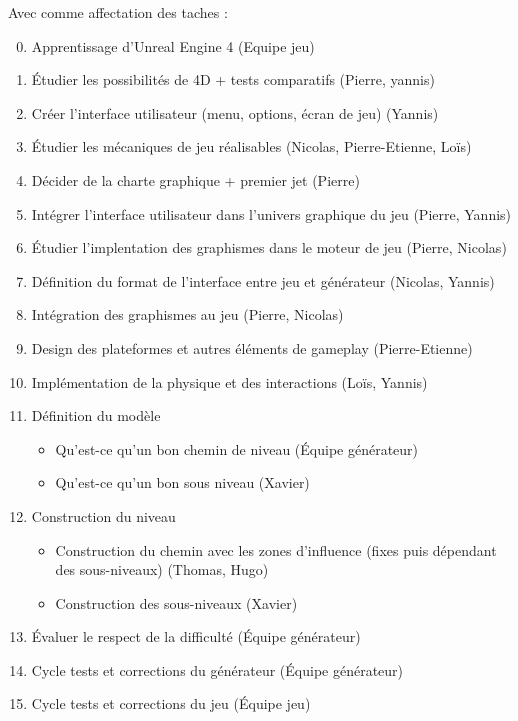 \documentclass[12pt]{article}
\begin{document}
        Avec comme affectation des taches :
        \begin{enumerate}
            \setcounter{enumi}{-1}
            \item Apprentissage d'Unreal Engine 4 (Equipe jeu)
            \item \'Etudier les possibilités de 4D + tests comparatifs (Pierre, yannis)
            \item Créer l'interface utilisateur (menu, options, écran de jeu) (Yannis)
            \item \'Etudier les mécaniques de jeu réalisables (Nicolas, Pierre-Etienne, Loïs)
            \item Décider de la charte graphique + premier jet (Pierre)
            \item Intégrer l'interface utilisateur dans l'univers graphique du jeu (Pierre, Yannis)
            \item \'Etudier l'implentation des graphismes dans le moteur de jeu (Pierre, Nicolas)
            \item Définition du format de l'interface entre jeu et générateur (Nicolas, Yannis)
            \item Intégration des graphismes au jeu (Pierre, Nicolas)
            \item Design des plateformes et autres éléments de gameplay (Pierre-Etienne)
            \item Implémentation de la physique et des interactions (Loïs, Yannis)
            \item Définition du modèle
                \begin{itemize}
        \renewcommand{\labelitemi}{$\bullet$}
                    \item Qu'est-ce qu'un bon chemin de niveau (\'Equipe générateur)
                    \item Qu'est-ce qu'un bon sous niveau (Xavier)
                \end{itemize}
            \item Construction du niveau
                \begin{itemize}
        \renewcommand{\labelitemi}{$\bullet$}
                    \item Construction du chemin avec les zones d'influence (fixes puis dépendant des sous-niveaux) (Thomas, Hugo)
                    \item Construction des sous-niveaux (Xavier)
                \end{itemize}
            \item \'Evaluer le respect de la difficulté (\'Equipe générateur)
            \item Cycle tests et corrections du générateur (\'Equipe générateur)
            \item Cycle tests et corrections du jeu (\'Equipe jeu)
        \end{enumerate}
        
        
\end{document}
